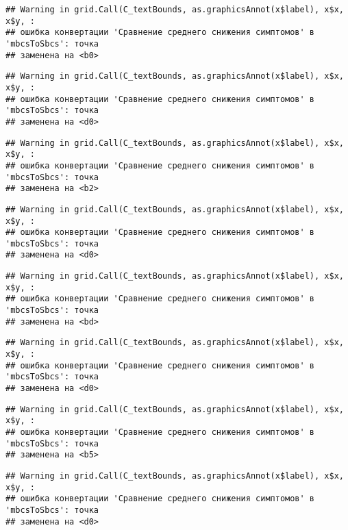 \documentclass[
]{article}
\begin{document}
\begin{verbatim}
## Warning in grid.Call(C_textBounds, as.graphicsAnnot(x$label), x$x, x$y, :
## ошибка конвертации 'Сравнение среднего снижения симптомов' в 'mbcsToSbcs': точка
## заменена на <b0>
\end{verbatim}

\begin{verbatim}
## Warning in grid.Call(C_textBounds, as.graphicsAnnot(x$label), x$x, x$y, :
## ошибка конвертации 'Сравнение среднего снижения симптомов' в 'mbcsToSbcs': точка
## заменена на <d0>
\end{verbatim}

\begin{verbatim}
## Warning in grid.Call(C_textBounds, as.graphicsAnnot(x$label), x$x, x$y, :
## ошибка конвертации 'Сравнение среднего снижения симптомов' в 'mbcsToSbcs': точка
## заменена на <b2>
\end{verbatim}

\begin{verbatim}
## Warning in grid.Call(C_textBounds, as.graphicsAnnot(x$label), x$x, x$y, :
## ошибка конвертации 'Сравнение среднего снижения симптомов' в 'mbcsToSbcs': точка
## заменена на <d0>
\end{verbatim}

\begin{verbatim}
## Warning in grid.Call(C_textBounds, as.graphicsAnnot(x$label), x$x, x$y, :
## ошибка конвертации 'Сравнение среднего снижения симптомов' в 'mbcsToSbcs': точка
## заменена на <bd>
\end{verbatim}

\begin{verbatim}
## Warning in grid.Call(C_textBounds, as.graphicsAnnot(x$label), x$x, x$y, :
## ошибка конвертации 'Сравнение среднего снижения симптомов' в 'mbcsToSbcs': точка
## заменена на <d0>
\end{verbatim}

\begin{verbatim}
## Warning in grid.Call(C_textBounds, as.graphicsAnnot(x$label), x$x, x$y, :
## ошибка конвертации 'Сравнение среднего снижения симптомов' в 'mbcsToSbcs': точка
## заменена на <b5>
\end{verbatim}

\begin{verbatim}
## Warning in grid.Call(C_textBounds, as.graphicsAnnot(x$label), x$x, x$y, :
## ошибка конвертации 'Сравнение среднего снижения симптомов' в 'mbcsToSbcs': точка
## заменена на <d0>
\end{verbatim}
\end{document}
